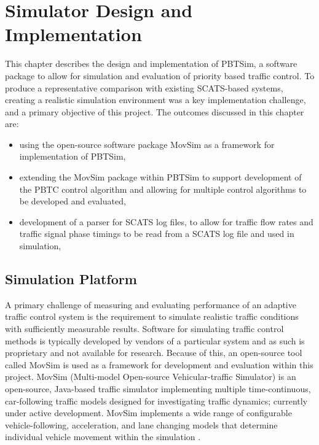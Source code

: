 \chapter{Simulator Design and Implementation}

This chapter describes the design and implementation of PBTSim, a software package to allow for simulation and evaluation of priority based traffic control. To produce a representative comparison with existing SCATS-based systems, creating a realistic simulation environment was a key implementation challenge, and a primary objective of this project. The outcomes discussed in this chapter are:

\begin{itemize}
\item using the open-source software package MovSim as a framework for implementation of PBTSim,
\item extending the MovSim package within PBTSim to support development of the PBTC control algorithm and allowing for multiple control algorithms to be developed and evaluated,
\item development of a parser for SCATS log files, to allow for traffic flow rates and traffic signal phase timings to be read from a SCATS log file and used in simulation,
\end{itemize}

\section{Simulation Platform}

A primary challenge of measuring and evaluating performance of an adaptive traffic control system is the requirement to simulate realistic traffic conditions with sufficiently measurable results. Software for simulating traffic control methods is typically developed by vendors of a particular system and as such is proprietary and not available for research. Because of this, an open-source tool called MovSim is used as a framework for development and evaluation within this project. MovSim (Multi-model Open-source Vehicular-traffic Simulator) is an open-source, Java-based traffic simulator implementing multiple time-continuous, car-following traffic models designed for investigating traffic dynamics; currently under active development. MovSim implements a wide range of configurable vehicle-following, acceleration, and lane changing models that determine individual vehicle movement within the simulation \cite{movsim,kesting2013traffic}.

